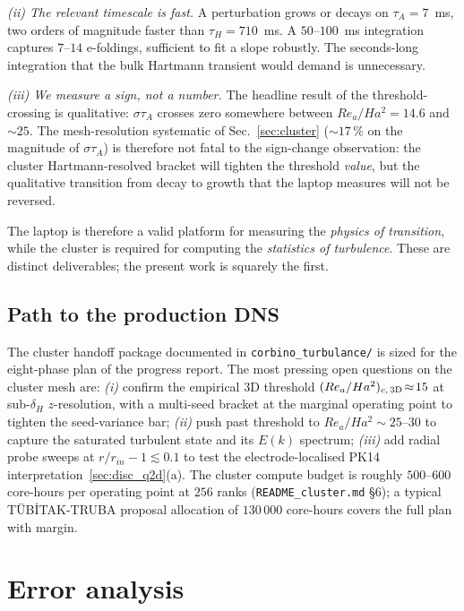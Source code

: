 \documentclass[aps,prl,twocolumn,superscriptaddress]{revtex4-2}
\begin{document}
\textit{(ii) The relevant timescale is fast.}  A perturbation grows
or decays on $\tau_A = 7$~ms, two orders of magnitude faster than
$\tau_H = 710$~ms.  A $50$--$100$~ms integration captures
$7$--$14$ e-foldings, sufficient to fit a slope robustly.  The
seconds-long integration that the bulk Hartmann transient would
demand is unnecessary.

\textit{(iii) We measure a sign, not a number.}  The headline
result of the threshold-crossing is qualitative: $\sigma\tau_A$
crosses zero somewhere between $Re_a/Ha^{2} = 14.6$ and
$\sim\!25$.  The mesh-resolution systematic of
Sec.~\ref{sec:cluster} ($\sim\!17\,\%$ on the magnitude of
$\sigma\tau_A$) is therefore not fatal to the sign-change
observation: the cluster Hartmann-resolved bracket will tighten
the threshold \emph{value}, but the qualitative transition from
decay to growth that the laptop measures will not be reversed.

The laptop is therefore a valid platform for measuring the
\emph{physics of transition}, while the cluster is required for
computing the \emph{statistics of turbulence}.  These are
distinct deliverables; the present work is squarely the first.

\subsection{Path to the production DNS}

The cluster handoff package documented in
\texttt{corbino\_turbulance/} is sized for the eight-phase plan of
the progress report.  The most pressing open questions on the
cluster mesh are: \textit{(i)} confirm the empirical 3D threshold
$(Re_a/Ha^{2})_{c,\,\rm 3D}\!\approx\!15$ at sub-$\delta_H$
$z$-resolution, with a multi-seed bracket at the marginal
operating point to tighten the seed-variance bar; \textit{(ii)}
push past threshold to $Re_a/Ha^{2}\!\sim\!25$--$30$ to capture the
saturated turbulent state and its $E(k)$ spectrum; \textit{(iii)}
add radial probe sweeps at $r/r_{in}-1\!\lesssim\!0.1$ to test the
electrode-localised PK14 interpretation~\ref{sec:disc_q2d}(a).
The cluster compute budget is roughly $500$--$600$ core-hours per
operating point at $256$ ranks (\texttt{README\_cluster.md} \S 6); a
typical T\"UB\.{I}TAK-TRUBA proposal allocation of $130\,000$
core-hours covers the full plan with margin.


\section{Error analysis}
\label{sec:err}
\end{document}
